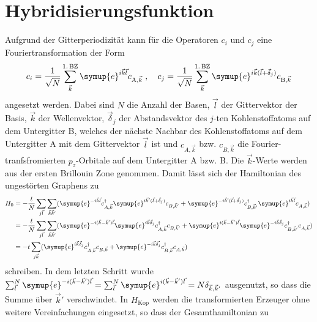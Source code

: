 \section{Hybridisierungsfunktion}
\label{sec:calc_greensfunction}
Aufgrund der Gitterperiodizität kann für die Operatoren $c_i$ und $c_j$ eine Fouriertransformation der Form 
\begin{equation}
    c_i = \frac{1}{\sqrt{N}} \sum_{\vec{k}}^{1. \, \text{BZ}} \symup{e}^{i\vec{k}\vec{l}} c_{\text{A}, \vec{k}} \; , 
    \quad c_j = \frac{1}{\sqrt{N}} \sum_{\vec{k}}^{1. \, \text{BZ}} \symup{e}^{i\vec{k}(\vec{l}+\vec{\delta}_j)} c_{\text{B}, \vec{k}} \label{eqn:fourier_ladder}
\end{equation}
angesetzt werden.
Dabei sind $N$ die Anzahl der Basen, $\vec{l}$ der Gittervektor der Basis, $\vec{k}$ der Wellenvektor, $\vec{\delta}_j$ der Abstandsvektor
des $j$-ten Kohlenstoffatoms auf dem Untergitter B, welches der nächste Nachbar des Kohlenstoffatoms auf dem Untergitter A mit dem Gittervektor $\vec{l}$ ist 
und $c_{A, \vec{k}}$ bzw. $c_{B, \vec{k}}$ die Fourier-tranfsfromierten $p_z$-Orbitale\cite{anders-fkt} auf dem Untergitter A bzw. B.
Die $\vec{k}$-Werte werden aus der ersten Brillouin Zone genommen.\cite{anders-fkt}
Damit lässt sich der Hamiltonian des ungestörten Graphens zu 
\begin{align*}
    H_0 &= -\frac{t}{N} \sum_{j\vec{l}} \sum_{\vec{k}\vec{k}'} ( \symup{e}^{-i\vec{k}\vec{l}}c^\dagger_{A,\vec{k}} 
    \symup{e}^{i\vec{k}'(\vec{l}+\vec{\delta}_j)}c_{B,\vec{k}'} + \symup{e}^{-i\vec{k}'(\vec{l}+\vec{\delta}_j)} c^\dagger_{B,\vec{k}'} 
    \symup{e}^{i\vec{k}\vec{l}}c_{A,\vec{k}}) \\
    &= -\frac{t}{N} \sum_{j\vec{l}} \sum_{\vec{k}\vec{k}'} ( \symup{e}^{-i(\vec{k}- \vec{k}')\vec{l}}\symup{e}^{i\vec{k}\vec{\delta}_j}c^\dagger_{A,\vec{k}} c_{B,\vec{k}'} + 
    \symup{e}^{i(\vec{k}- \vec{k}')\vec{l}} \symup{e}^{-i\vec{k}\vec{\delta}_j} c^\dagger_{B,\vec{k}'}c_{A,\vec{k}}) \\
    &= -t \sum_{j\vec{k}} ( \symup{e}^{i\vec{k}\vec{\delta}_j}c^\dagger_{A,\vec{k}} c_{B,\vec{k}} + 
    \symup{e}^{-i\vec{k}\vec{\delta_j}} c^\dagger_{B,\vec{k}}c_{A,\vec{k}})
\end{align*}
schreiben.
In dem letzten Schritt wurde $\sum_{\vec{l}}^N \symup{e}^{-i(\vec{k}- \vec{k}')\vec{l}} 
= \sum_{\vec{l}}^N \symup{e}^{i(\vec{k}- \vec{k}')\vec{l}} = N\delta_{\vec{k}, \vec{k}'}$ ausgenutzt, so dass die Summe über $\vec{k}'$ verschwindet.
In $H_\text{Kop}$ werden die transformierten Erzeuger ohne weitere Vereinfachungen eingesetzt,  so dass der Gesamthamiltonian zu 
